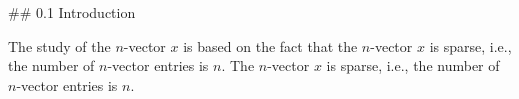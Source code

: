 

## 0.1 Introduction

The study of the \(n\)-vector \(x\) is based on the fact that the \(n\)-vector \(x\) is sparse, i.e., the number of \(n\)-vector entries is \(n\). The \(n\)-vector \(x\) is sparse, i.e., the number of \(n\)-vector entries is \(n\).

